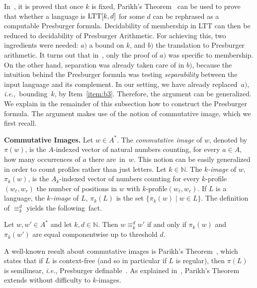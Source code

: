 \documentclass{LMCS}
\newcommand\nat{\ensuremath{\mathbb{N}}\xspace}
\newcommand{\ltt}{\textup{LTT}\xspace}
\newcommand\image[1]{$#1$-image\xspace}
\newcommand\images[1]{$#1$-images\xspace}
\newcommand\kimage{\image{k}}
\newcommand\kimages{\images{k}}
\newcommand\profile[1]{$#1$-profile\xspace}
\newcommand\kprofile{\profile{k}}
\newcommand\ltteq[2]{\ensuremath{\equiv_{#1}^{#2}}\xspace}
\newcommand\kdltteq{\ltteq{k}{d}}
\theoremstyle{plain}
\begin{document}
In~\cite{bojLTT}, it is proved that once $k$ is fixed, Parikh's
Theorem~\cite{Parikh:Context-Free-Languages:1966:a} can be used to
prove that whether a language is $\ltt[k,d]$ for some $d$ can be
rephrased as a computable Presburger formula. Decidability of
membership in \ltt can then be reduced to decidability of Presburger
Arithmetic. For achieving this, two ingredients were needed: $a)$ a
bound on $k$, and $b)$ the translation to Presburger arithmetic. It
turns out that in~\cite{bojLTT}, only the proof of $a)$ was specific to
membership. On the other hand, separation was already taken care of in
$b)$, because the intuition behind the Presburger formula was 
testing \emph{separability} between the input language and its complement. In
our setting, we have already replaced~$a)$, \emph{i.e.},~bounding~$k$,
by Item~\eqref{item:b3}. Therefore, the argument can be generalized. We
explain in the remainder of this subsection how to construct the Presburger
formula. The argument makes use of the notion of
commutative image, which we first recall.

\medskip
\noindent
{\textbf{Commutative Images.}} Let $w\in A^{*}$. The \emph{commutative
  image} of $w$, denoted by $\pi(w)$, is the $A$-indexed vector of
natural numbers counting, for every $a \in A$, how many occurrences of $a$
there are~in~$w$. This notion can be easily generalized in order to
count profiles rather than just letters. Let $k\in\nat$. The
\emph{\kimage } of $w$, $\pi_k(w)$, is the $A_k$-indexed vector of
numbers  counting for every \kprofile $(w_\ell,w_r)$ the number of
positions in $w$ with \kprofile $(w_\ell,w_r)$.  If $L$ is a language, the
\emph{\kimage } of $L$, $\pi_k(L)$ is the set $\{\pi_k(w) \mid w \in
L\}$. The definition of \kdltteq yields the following~fact.



\begin{fact} \label{lem:eqredef}
  Let $w,w' \in A^{*}$ and let $k,d \in \nat$. Then $w \kdltteq w'$ if and only if
  $\pi_k(w)$ and $\pi_k(w')$ are equal componentwise up to threshold $d$.
\end{fact}

A well-known result about commutative images is Parikh's
Theorem~\cite{Parikh:Context-Free-Languages:1966:a}, which states that
if $L$ is context-free (and so in particular if $L$ is
regular), then $\pi(L)$ is semilinear, \emph{i.e.}, Presburger
definable~\cite{Ginsburg&Spanier:Semigroups-Presburger-Formulas-Languages:1966:a}. As
explained in~\cite{bojLTT}, Parikh's Theorem extends without
difficulty to \kimages.
\end{document}
